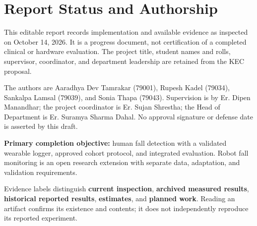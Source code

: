 \chapter*{Report Status and Authorship}
This editable report records implementation and available evidence as inspected on October 14, 2026. It is a progress document, not certification of a completed clinical or hardware evaluation. The project title, student names and rolls, supervisor, coordinator, and department leadership are retained from the KEC proposal.

The authors are Aaradhya Dev Tamrakar (79001), Rupesh Kadel (79034), Sankalpa Lamsal (79039), and Sonia Thapa (79043). Supervision is by Er. Dipen Manandhar; the project coordinator is Er. Sujan Shrestha; the Head of Department is Er. Suramya Sharma Dahal. No approval signature or defense date is asserted by this draft.

\textbf{Primary completion objective:} human fall detection with a validated wearable logger, approved cohort protocol, and integrated evaluation. Robot fall monitoring is an open research extension with separate data, adaptation, and validation requirements.

Evidence labels distinguish \textbf{current inspection}, \textbf{archived measured results}, \textbf{historical reported results}, \textbf{estimates}, and \textbf{planned work}. Reading an artifact confirms its existence and contents; it does not independently reproduce its reported experiment.
